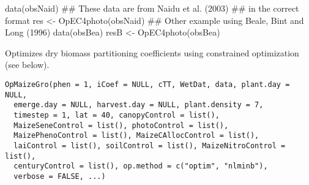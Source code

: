 \documentclass[letterpaper]{book}
\begin{document}
%
\begin{Examples}
\begin{ExampleCode}
data(obsNaid)
## These data are from Naidu et al. (2003)
## in the correct format
res <- OpEC4photo(obsNaid)
## Other example using Beale, Bint and Long (1996)
data(obsBea)
resB <- OpEC4photo(obsBea)
\end{ExampleCode}
\end{Examples}
%
\begin{Description}\relax
Optimizes dry biomass partitioning coefficients using
constrained optimization (see below).
\end{Description}
%
\begin{Usage}
\begin{verbatim}
OpMaizeGro(phen = 1, iCoef = NULL, cTT, WetDat, data, plant.day = NULL,
  emerge.day = NULL, harvest.day = NULL, plant.density = 7,
  timestep = 1, lat = 40, canopyControl = list(),
  MaizeSeneControl = list(), photoControl = list(),
  MaizePhenoControl = list(), MaizeCAllocControl = list(),
  laiControl = list(), soilControl = list(), MaizeNitroControl = list(),
  centuryControl = list(), op.method = c("optim", "nlminb"),
  verbose = FALSE, ...)
\end{verbatim}
\end{Usage}
%
\end{document}
